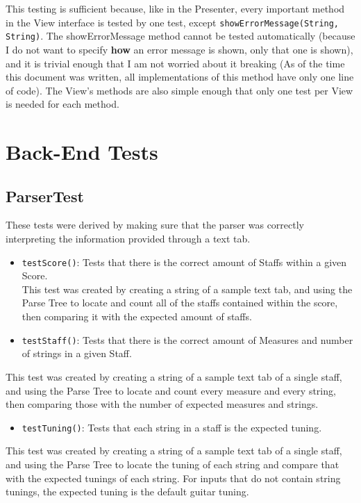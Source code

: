 \documentclass[11pt]{article}
\begin{document}
This testing is sufficient because, like in the Presenter, every important method in the View interface is tested by one test, except \texttt{showErrorMessage(String, String)}.  The showErrorMessage method cannot be tested automatically (because I do not want to specify \textbf{how} an error message is shown, only that one is shown), and it is trivial enough that I am not worried about it breaking (As of the time this document was written, all implementations of this method have only one line of code).  The View's methods are also simple enough that only one test per View is needed for each method.\\
\section{Back-End Tests}
\label{sec:org31e394a}
\subsection{ParserTest}
\label{sec:orgc458722}
These tests were derived by making sure that the parser was correctly interpreting the information provided through a text tab.\\
\begin{itemize}
\item \texttt{testScore()}: Tests that there is the correct amount of Staffs within a given Score.\\
This test was created by creating a string of a sample text tab, and using the Parse Tree to locate and count all of the staffs contained within the score, then comparing it with the expected amount of staffs.\\
\item \texttt{testStaff()}: Tests that there is the correct amount of Measures and number of strings in a given Staff.\\
\end{itemize}
This test was created by creating a string of a sample text tab of a single staff, and using the Parse Tree to locate and count every measure and every string, then comparing those with the number of expected measures and strings.\\
\begin{itemize}
\item \texttt{testTuning()}: Tests that each string in a staff is the expected tuning.\\
\end{itemize}
This test was created by creating a string of a sample text tab of a single staff, and using the Parse Tree to locate the tuning of each string and compare that with the expected tunings of each string. For inputs that do not contain string tunings, the expected tuning is the default guitar tuning.\\
\end{document}
